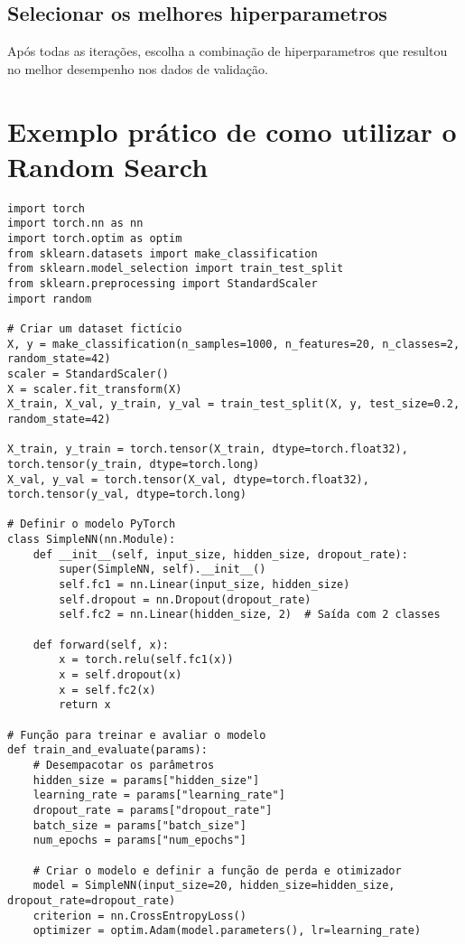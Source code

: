 \documentclass{article}
\begin{document}
\subsection{Selecionar os melhores hiperparametros}
Após todas as iterações, escolha a combinação de hiperparametros que resultou no melhor desempenho nos dados de validação.
\section{Exemplo prático de como utilizar o Random Search}
\begin{verbatim}
import torch
import torch.nn as nn
import torch.optim as optim
from sklearn.datasets import make_classification
from sklearn.model_selection import train_test_split
from sklearn.preprocessing import StandardScaler
import random

# Criar um dataset fictício
X, y = make_classification(n_samples=1000, n_features=20, n_classes=2, random_state=42)
scaler = StandardScaler()
X = scaler.fit_transform(X)
X_train, X_val, y_train, y_val = train_test_split(X, y, test_size=0.2, random_state=42)

X_train, y_train = torch.tensor(X_train, dtype=torch.float32), torch.tensor(y_train, dtype=torch.long)
X_val, y_val = torch.tensor(X_val, dtype=torch.float32), torch.tensor(y_val, dtype=torch.long)

# Definir o modelo PyTorch
class SimpleNN(nn.Module):
    def __init__(self, input_size, hidden_size, dropout_rate):
        super(SimpleNN, self).__init__()
        self.fc1 = nn.Linear(input_size, hidden_size)
        self.dropout = nn.Dropout(dropout_rate)
        self.fc2 = nn.Linear(hidden_size, 2)  # Saída com 2 classes

    def forward(self, x):
        x = torch.relu(self.fc1(x))
        x = self.dropout(x)
        x = self.fc2(x)
        return x

# Função para treinar e avaliar o modelo
def train_and_evaluate(params):
    # Desempacotar os parâmetros
    hidden_size = params["hidden_size"]
    learning_rate = params["learning_rate"]
    dropout_rate = params["dropout_rate"]
    batch_size = params["batch_size"]
    num_epochs = params["num_epochs"]

    # Criar o modelo e definir a função de perda e otimizador
    model = SimpleNN(input_size=20, hidden_size=hidden_size, dropout_rate=dropout_rate)
    criterion = nn.CrossEntropyLoss()
    optimizer = optim.Adam(model.parameters(), lr=learning_rate)


\end{verbatim}
\end{document}
